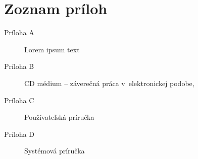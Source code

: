 \chapter*{Zoznam príloh}

\thispagestyle{empty}

\begin{description}
	\item[Príloha A] Lorem ipsum text
    \item[Príloha B] CD médium -- záverečná práca v~elektronickej podobe,
    \item[Príloha C] Používateľská príručka
    \item[Príloha D] Systémová príručka
\end{description}

